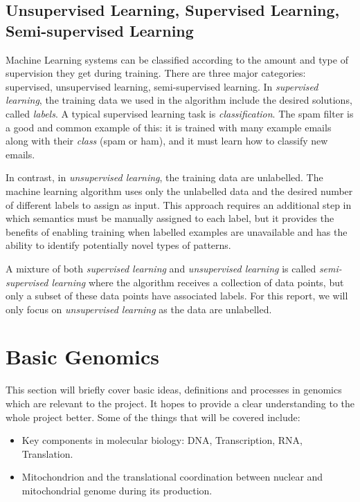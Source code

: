 \subsection{Unsupervised Learning, Supervised Learning, Semi-supervised Learning}
Machine Learning systems can be classified according to the amount and type of supervision they get during training. There are three major categories: supervised, unsupervised learning, semi-supervised learning. In \textit{supervised learning}, the training data we used in the algorithm include the desired solutions, called \textit{labels}. A typical supervised learning task is \textit{classification}. The spam filter is a good and common example of this: it is trained with many example emails along with their \textit{class} (spam or ham), and it must learn how to classify new emails.

In contrast, in \textit{unsupervised learning}, the training data are unlabelled. The machine learning algorithm uses only the unlabelled data and the desired number of different labels to assign as input. This approach requires an additional step in which semantics must be manually assigned to each label, but it provides the benefits of enabling training when labelled examples are unavailable and has the ability to identify potentially novel types of patterns.

A mixture of both \textit{supervised learning} and \textit{unsupervised learning} is called \textit{semi-supervised learning} where the algorithm receives a collection of data points, but only a subset of these data points have associated labels. For this report, we will only focus on \textit{unsupervised learning} as the data are unlabelled.


\section{Basic Genomics}
This section will briefly cover basic ideas, definitions and processes in genomics which are relevant to the project. It hopes to provide a clear understanding to the whole project better. Some of the things that will be covered include:

\begin{itemize}
	\item Key components in molecular biology: DNA, Transcription, RNA, Translation.
	\item Mitochondrion and the translational coordination between nuclear and mitochondrial genome during its production.
\end{itemize}


